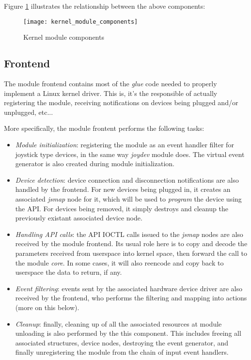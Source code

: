 Figure \ref{fig:kernel_module_components} illustrates the relationship between the above components:
\begin{figure}[htb]
\centering
\texttt{[image: kernel\_module\_components]}
\caption{Kernel module components}
\label{fig:kernel_module_components}
\end{figure}


\subsection{Frontend}
The module frontend contains most of the \emph{glue} code needed to properly implement a Linux kernel driver. This is, it's the responsible of actually registering the module, receiving notifications on devices being plugged and/or unplugged, etc...

More specifically, the module frontent performs the following tasks:
\begin{itemize}
 \item \emph{Module initialization}: registering the module as an event handler filter for joystick type devices, in the same way \emph{joydev} module does. The virtual event generator is also created during module initialization.
 \item \emph{Device detection}: device connection and disconnection notifications are also handled by the frontend. For new devices being plugged in, it creates an associated \emph{jsmap} node for it, which will be used to \emph{program} the device using the API. For devices being removed, it simply destroys and cleanup the previously existant associated device node.
 \item \emph{Handling API calls}: the API IOCTL calls issued to the \emph{jsmap} nodes are also received by the module frontend. Its usual role here is to copy and decode the parameters received from userspace into kernel space, then forward the call to the module \emph{core}. In some cases, it will also reencode and copy back to userspace the data to return, if any.
 \item \emph{Event filtering}: events sent by the associated hardware device driver are also received by the frontend, who performs the filtering and mapping into actions (more on this below).
 \item \emph{Cleanup}: finally, cleaning up of all the associated resources at module unloading is also performed by the this component. This includes freeing all associated structures, device nodes, destroying the event generator, and finally unregistering the module from the chain of input event handlers.
\end{itemize}

